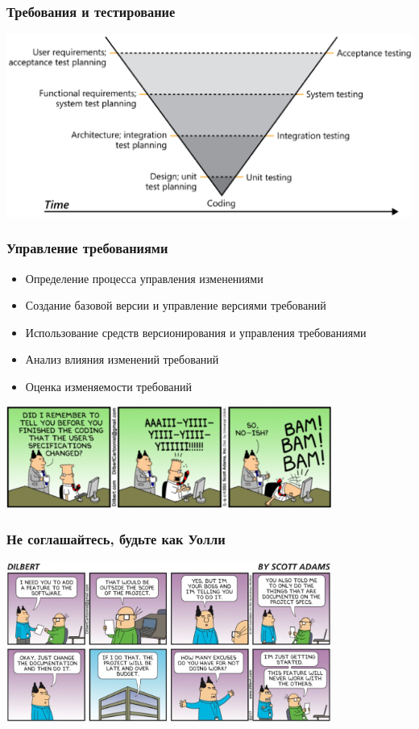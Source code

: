 \documentclass{../../slides-style}
\begin{document}
    \begin{frame}
        \frametitle{Требования и тестирование}
        \begin{center}
            \includegraphics[width=\textwidth]{requirementsAndTesting.png}
        \end{center}
    \end{frame}

    \begin{frame}
        \frametitle{Управление требованиями}
        \begin{itemize}
            \item Определение процесса управления изменениями
            \item Создание базовой версии и управление версиями требований
            \item Использование средств версионирования и управления требованиями
            \item Анализ влияния изменений требований
            \item Оценка изменяемости требований
        \end{itemize}
        \begin{center}
            \includegraphics[width=0.8\textwidth]{dilbertAndRequirementsManagement.png}
        \end{center}
    \end{frame}

    \begin{frame}
        \frametitle{Не соглашайтесь, будьте как Уолли}
        \begin{center}
            \includegraphics[width=0.8\textwidth]{requirementsAndWally.png}
        \end{center}
    \end{frame}
\end{document}
